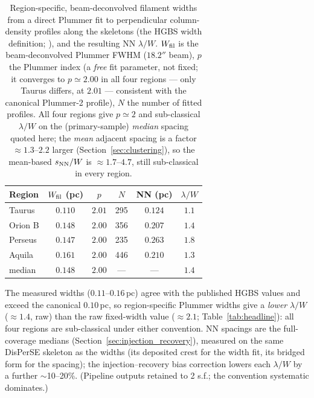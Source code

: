 \documentclass[usenatbib,twoside,twocolumn]{mnras}
\begin{document}
\begin{table}
\caption{Region-specific, beam-deconvolved filament widths from a direct Plummer fit to perpendicular column-density profiles along the skeletons (the HGBS width definition; \citealt{Arzoumanian2019}), and the resulting NN $\lambda/W$. $W_{\rm fil}$ is the beam-deconvolved Plummer FWHM ($18.2''$ beam), $p$ the Plummer index (a \emph{free} fit parameter, not fixed; it converges to $p\simeq2.00$ in all four regions --- only Taurus differs, at $2.01$ --- consistent with the canonical Plummer-2 profile), $N$ the number of fitted profiles. All four regions give $p\simeq2$ and sub-classical $\lambda/W$ on the (primary-sample) \emph{median} spacing quoted here; the \emph{mean} adjacent spacing is a factor $\approx1.3$--$2.2$ larger (Section~\ref{sec:clustering}), so the mean-based $s_{\rm NN}/W$ is $\approx1.7$--$4.7$, still sub-classical in every region.}
\label{tab:widths}
\footnotesize
\setlength{\tabcolsep}{3pt}
\begin{tabular}{p{1.7cm}ccccc}
\toprule
Region & $W_{\rm fil}$ (pc) & $p$ & $N$ & NN (pc) & $\lambda/W$ \\
\midrule
Taurus  & $0.110$ & $2.01$ & 295 & $0.124$ & $1.1$ \\
Orion B & $0.148$ & $2.00$ & 356 & $0.207$ & $1.4$ \\
Perseus & $0.147$ & $2.00$ & 235 & $0.263$ & $1.8$ \\
Aquila  & $0.161$ & $2.00$ & 446 & $0.210$ & $1.3$ \\
\midrule
median  & $0.148$ & $2.00$ & --- & --- & $1.4$ \\
\bottomrule
\end{tabular}
\par\vspace{2pt}
\footnotesize The measured widths ($0.11$--$0.16$\,pc) agree with the published HGBS values and exceed the canonical $0.10$\,pc, so region-specific Plummer widths give a \emph{lower} $\lambda/W$ ($\approx1.4$, raw) than the raw fixed-width value ($\approx2.1$; Table~\ref{tab:headline}): all four regions are sub-classical under either convention. NN spacings are the full-coverage medians (Section~\ref{sec:injection_recovery}), measured on the same DisPerSE skeleton as the widths (its deposited crest for the width fit, its bridged form for the spacing); the injection--recovery bias correction lowers each $\lambda/W$ by a further $\sim$10--20\%. (Pipeline outputs retained to 2 s.f.; the convention systematic dominates.)
\end{table}
\end{document}
